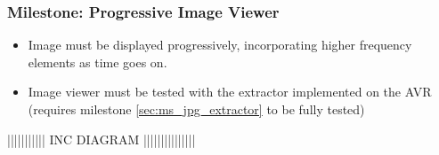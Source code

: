 	\subsubsection{Milestone: Progressive Image Viewer}
		\label{sec:ms_prog_img_viewer}
		\begin{itemize}
			\item  Image must be displayed progressively, incorporating higher
				frequency elements as time goes on.
			\item 	Image viewer must be tested with the extractor
				implemented on the AVR (requires
				milestone \ref{sec:ms_jpg_extractor} to be fully tested)
		\end{itemize}



||||||||||| INC DIAGRAM |||||||||||||||
